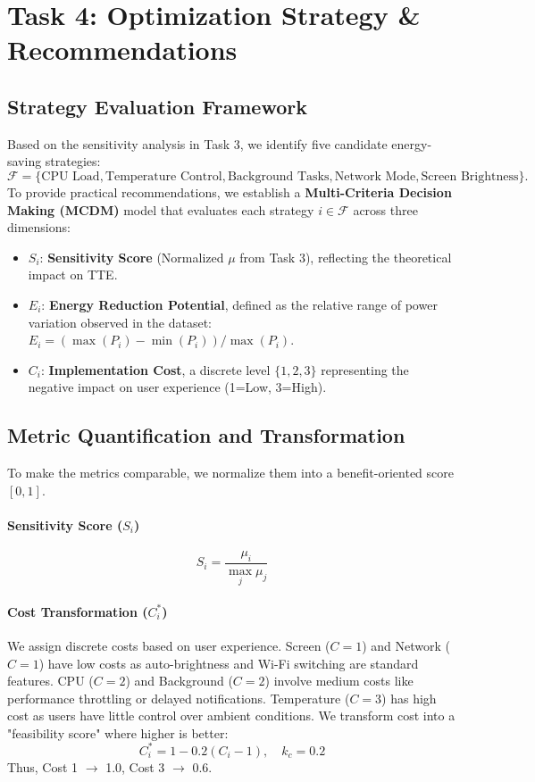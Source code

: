 \documentclass{mcmthesis}
\begin{document}
\section{Task 4: Optimization Strategy \& Recommendations}

\subsection{Strategy Evaluation Framework}
Based on the sensitivity analysis in Task 3, we identify five candidate energy-saving strategies:
\[
    \mathcal{F} = \{ \text{CPU Load}, \text{Temperature Control}, \text{Background Tasks}, \text{Network Mode}, \text{Screen Brightness} \}.
\]
To provide practical recommendations, we establish a \textbf{Multi-Criteria Decision Making (MCDM)} model that evaluates each strategy $i \in \mathcal{F}$ across three dimensions:
\begin{itemize}
    \item $S_i$: \textbf{Sensitivity Score} (Normalized $\mu$ from Task 3), reflecting the theoretical impact on TTE.
    \item $E_i$: \textbf{Energy Reduction Potential}, defined as the relative range of power variation observed in the dataset: $E_i = (\max(P_i) - \min(P_i)) / \max(P_i)$.
    \item $C_i$: \textbf{Implementation Cost}, a discrete level $\{1, 2, 3\}$ representing the negative impact on user experience (1=Low, 3=High).
\end{itemize}

\subsection{Metric Quantification and Transformation}
To make the metrics comparable, we normalize them into a benefit-oriented score $[0, 1]$.

\paragraph{Sensitivity Score ($S_i$)}
\begin{equation}
S_i = \frac{\mu_i}{\max_j \mu_j}
\end{equation}

\paragraph{Cost Transformation ($C_i^*$)}
We assign discrete costs based on user experience. Screen ($C=1$) and Network ($C=1$) have low costs as auto-brightness and Wi-Fi switching are standard features. CPU ($C=2$) and Background ($C=2$) involve medium costs like performance throttling or delayed notifications. Temperature ($C=3$) has high cost as users have little control over ambient conditions. We transform cost into a "feasibility score" where higher is better:
\begin{equation}
C_i^* = 1 - 0.2(C_i - 1), \quad k_c=0.2
\end{equation}
Thus, Cost 1 $\to$ 1.0, Cost 3 $\to$ 0.6.
\end{document}

